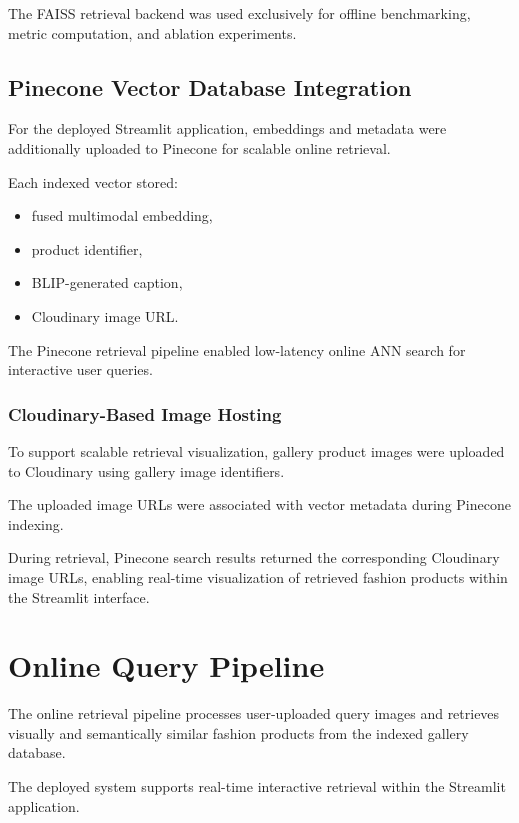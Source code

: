 \documentclass[11pt,a4paper]{article}
\begin{document}
The FAISS retrieval backend was used exclusively for offline benchmarking, metric computation, and ablation experiments.

\subsection{Pinecone Vector Database Integration}

For the deployed Streamlit application, embeddings and metadata were additionally uploaded to Pinecone for scalable online retrieval.

Each indexed vector stored:
\begin{itemize}
    \item fused multimodal embedding,
    \item product identifier,
    \item BLIP-generated caption,
    \item Cloudinary image URL.
\end{itemize}

The Pinecone retrieval pipeline enabled low-latency online ANN search for interactive user queries.

\subsubsection{Cloudinary-Based Image Hosting}

To support scalable retrieval visualization, gallery product images were uploaded to Cloudinary using gallery image identifiers.

The uploaded image URLs were associated with vector metadata during Pinecone indexing.

During retrieval, Pinecone search results returned the corresponding Cloudinary image URLs, enabling real-time visualization of retrieved fashion products within the Streamlit interface.

\section{Online Query Pipeline}

The online retrieval pipeline processes user-uploaded query images and retrieves visually and semantically similar fashion products from the indexed gallery database.

The deployed system supports real-time interactive retrieval within the Streamlit application.
\end{document}
